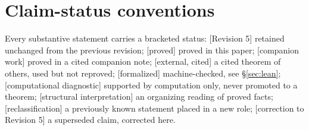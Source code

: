 \documentclass[11pt]{article}
\theoremstyle{plain}
\theoremstyle{definition}
\theoremstyle{remark}
\begin{document}
\section{Claim-status conventions}\label{sec:status}

Every substantive statement carries a bracketed status:
\textsf{[Revision 5]} retained unchanged from the previous revision;
\textsf{[proved]} proved in this paper;
\textsf{[companion work]} proved in a cited companion note;
\textsf{[external, cited]} a cited theorem of others, used but not reproved;
\textsf{[formalized]} machine-checked, see \S\ref{sec:lean};
\textsf{[computational diagnostic]} supported by computation only, never promoted to a theorem;
\textsf{[structural interpretation]} an organizing reading of proved facts;
\textsf{[reclassification]} a previously known statement placed in a new role;
\textsf{[correction to Revision 5]} a superseded claim, corrected here.
\end{document}
